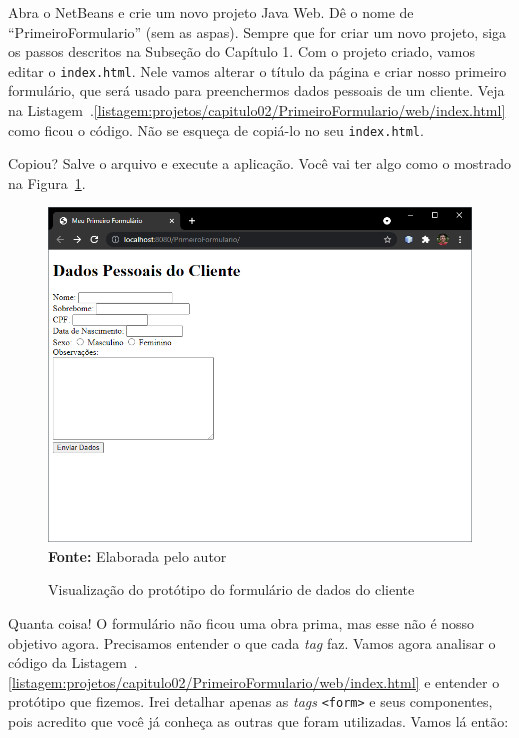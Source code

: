 Abra o NetBeans e crie um novo projeto Java Web. Dê o nome de ``PrimeiroFormulario'' (sem as aspas). Sempre que for criar um novo projeto, siga os passos descritos na Subseção \label{subsec:primeiroProjeto} do Capítulo 1. Com o projeto criado, vamos editar o \texttt{index.html}. Nele vamos alterar o título da página e criar nosso primeiro formulário, que será usado para preenchermos dados pessoais de um cliente. Veja na Listagem~\thechapter.\ref{listagem:projetos/capitulo02/PrimeiroFormulario/web/index.html} como ficou o código. Não se esqueça de copiá-lo no seu \texttt{index.html}.


Copiou? Salve o arquivo e execute a aplicação. Você vai ter algo como o mostrado na Figura~\ref{fig:cap02PrimeiroFormulario}.

\FloatBarrier
\begin{figure}[!htbp]
    \centering
    \caption{Visualização do protótipo do formulário de dados do cliente}
    \includegraphics[scale=0.7]{imagens/cap02PrimeiroFormulario}
    \\\textbf{Fonte:} Elaborada pelo autor
    \label{fig:cap02PrimeiroFormulario}
\end{figure}
\FloatBarrier

Quanta coisa! O formulário não ficou uma obra prima, mas esse não é nosso objetivo agora. Precisamos entender o que cada \textit{tag} faz. Vamos agora analisar o código da Listagem~\thechapter.\ref{listagem:projetos/capitulo02/PrimeiroFormulario/web/index.html} e entender o protótipo que fizemos. Irei detalhar apenas as \textit{tags} \texttt{<form>} e seus componentes, pois acredito que você já conheça as outras que foram utilizadas. Vamos lá então:

